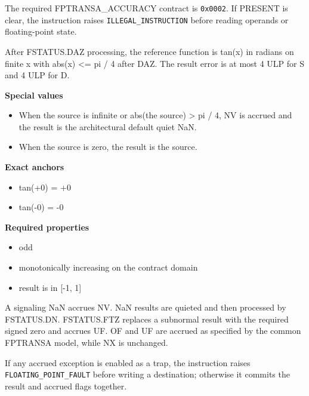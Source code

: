 The required FPTRANSA\_ACCURACY contract is \texttt{0x0002}. If PRESENT is clear, the instruction raises \texttt{ILLEGAL\_INSTRUCTION} before reading operands or floating-point state.

After FSTATUS.DAZ processing, the reference function is tan(x) in radians on finite x with abs(x) \textless{}= pi / 4 after DAZ. The result error is at most 4 ULP for S and 4 ULP for D.

\textbf{Special values}\par
\begin{itemize}
\item When the source is infinite or abs(the source) \textgreater{} pi / 4, NV is accrued and the result is the architectural default quiet NaN.
\item When the source is zero, the result is the source.
\end{itemize}

\textbf{Exact anchors}\par
\begin{itemize}
\item tan(+0) = +0
\item tan(-0) = -0
\end{itemize}

\textbf{Required properties}\par
\begin{itemize}
\item odd
\item monotonically increasing on the contract domain
\item result is in [-1, 1]
\end{itemize}

A signaling NaN accrues NV. NaN results are quieted and then processed by FSTATUS.DN. FSTATUS.FTZ replaces a subnormal result with the required signed zero and accrues UF. OF and UF are accrued as specified by the common FPTRANSA model, while NX is unchanged.

If any accrued exception is enabled as a trap, the instruction raises \texttt{FLOATING\_POINT\_FAULT} before writing a destination; otherwise it commits the result and accrued flags together.
